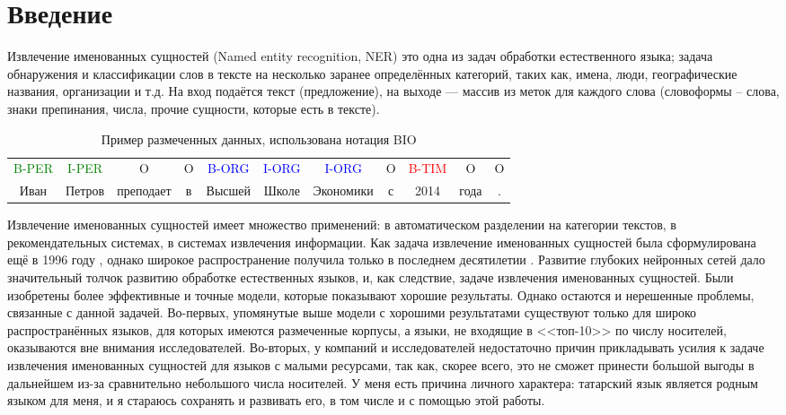 \section{Введение}

Извлечение именованных сущностей (Named entity recognition, NER) это одна из задач обработки естественного языка; задача обнаружения и классификации слов в тексте на несколько заранее определённых категорий, таких как, имена, люди, географические названия, организации и т.д. На вход подаётся текст (предложение), на выходе --- массив из меток для каждого слова (словоформы -- слова, знаки препинания, числа, прочие сущности, которые есть в тексте).

\begin{table}[h]
\begin{tabular}[h]{ccccccccccc}
\textcolor{green}{B-PER} & \textcolor{green}{I-PER} & O & O & \textcolor{blue}{B-ORG} &  \textcolor{blue}{I-ORG} &  \textcolor{blue}{I-ORG} & O & \textcolor{red}{B-TIM} & O & O \\
Иван & Петров & преподает & в & Высшей & Школе & Экономики & с & 2014 & года & . \\
\end{tabular}
\caption{Пример размеченных данных, использована нотация BIO}
\end{table}

Извлечение именованных сущностей имеет множество применений: в автоматическом разделении на категории текстов, в рекомендательных системах, в системах извлечения информации. Как задача извлечение именованных сущностей была сформулирована ещё в 1996 году \cite{first_NER}, однако широкое распространение получила только в последнем десятилетии \cite{DBLP:journals/corr/abs-1812-09449}. Развитие глубоких нейронных сетей дало значительный толчок развитию обработке естественных языков, и, как следствие, задаче извлечения именованных сущностей. Были изобретены более эффективные и точные модели, которые показывают хорошие результаты. Однако остаются и нерешенные проблемы, связанные с данной задачей. Во-первых, упомянутые выше модели с хорошими результатами существуют только для широко распространённых языков, для которых имеются размеченные корпусы, а языки, не входящие в <<топ-10>> по числу носителей, оказываются вне внимания исследователей. Во-вторых, у компаний и исследователей недостаточно причин прикладывать усилия к задаче извлечения именованных сущностей для языков с малыми ресурсами, так как, скорее всего, это не сможет принести большой выгоды в дальнейшем из-за сравнительно небольшого числа носителей. У меня есть причина личного характера: татарский язык является родным языком для меня, и я стараюсь сохранять и развивать его, в том числе и с помощью этой работы.

